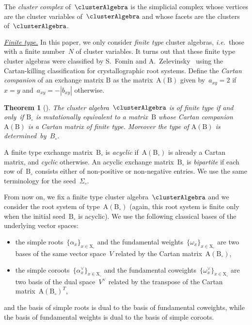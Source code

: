 \documentclass{amsart}
\newtheorem{theorem}{Theorem}[section]
\theoremstyle{definition}
\newcommand{\transpose}[1]{{#1}^T} %
\newcommand{\ie}{\textit{i.e.}~} %
\newcommand{\darkblue}{\color{darkblue}} %
\newcommand{\defn}[1]{\textsl{\darkblue #1}} %
\newcommand{\para}[1]{\medskip\noindent\uline{\textit{#1.}}} %
\newcommand{\seed}{\Sigma} %
\newcommand{\cluster}{\mathrm{X}} %
\newcommand{\B}{\mathrm{B}} %
\newcommand{\A}[1]{\mathrm{A}({#1})} %
\newcommand{\simpleRoot}{\alpha} %
\newcommand{\fundamentalWeight}{\omega} %
\begin{document}
The \defn{cluster complex} of~$\clusterAlgebra$ is the simplicial complex whose vertices are the cluster variables of~$\clusterAlgebra$ and whose facets are the clusters of~$\clusterAlgebra$.

\para{Finite type}
%
In this paper, we only consider \defn{finite type} cluster algebras, \ie those with a finite number~$N$ of cluster variables.
It turns out that these finite type cluster algebras were classified by S.~Fomin and A.~Zelevinsky~\cite{FominZelevinsky-ClusterAlgebrasII} using the Cartan-killing classification for crystallographic root systems.
Define the \defn{Cartan companion} of an exchange matrix $\B$ as the matrix~$\A{\B}$ given by~$a_{xy} = 2$ if~$x = y$ and~$a_{xy} = -|b_{xy}|$ otherwise.

\begin{theorem}[{\cite[Theorem~1.4]{FominZelevinsky-ClusterAlgebrasII}}]
\label{thm:finiteTypeClassification}
The cluster algebra~$\clusterAlgebra$ is of finite type if and only~if $\B_\circ$ is mutationally equivalent to a matrix~$\B$ whose Cartan companion~$\A{\B}$ is a Cartan matrix of finite type. Moreover the type of $\A{\B}$ is determined~by~$B_\circ$.
\end{theorem}

A finite type exchange matrix~$\B_\circ$ is \defn{acyclic} if~$\A{\B_\circ}$ is already a Cartan matrix, and \defn{cyclic} otherwise.
An acyclic exchange matrix~$\B_\circ$ is \defn{bipartite} if each row of~$\B_\circ$ consists either of non-positive or non-negative entries.
We use the same terminology for the seed~$\seed_\circ$.

From now on, we fix a finite type cluster algebra~$\clusterAlgebra$ and we consider the root system of type~$\A{\B_\circ}$ (again, this root system is finite only when the initial seed~$\B_\circ$ is acyclic). We use the following classical bases of the underlying vector spaces:
\begin{itemize}
\item the simple roots~$\{\simpleRoot_x\}_{x \in \cluster_\circ}$ and the fundamental weights~$\{\fundamentalWeight_x\}_{x \in \cluster_\circ}$ are two bases of the same vector space~$V$ related by the Cartan matrix~$\A{\B_\circ}$,
\item the simple coroots~$\{\simpleRoot^\vee_x\}_{x \in \cluster_\circ}$ and the fundamental coweights~$\{\fundamentalWeight^\vee_x\}_{x \in \cluster_\circ}$ are two basis of the dual space~$V^\vee$ related by the transpose of the Cartan matrix~$\transpose{\A{\B_\circ}}$,
\end{itemize}
and the basis of simple roots is dual to the basis of fundamental coweights, while the basis of fundamental weights is dual to the basis of simple coroots.
\end{document}
